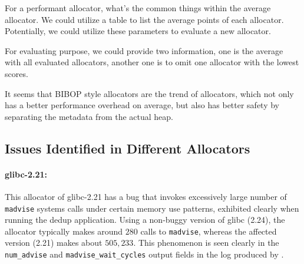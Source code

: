 


For a performant allocator, what's the common things within the average allocator. We could utilize a table to list the average points of each allocator. Potentially, we could utilize these parameters to evaluate a new allocator. 

For evaluating purpose, we could provide two information, one is the average with all evaluated allocators, another one is to omit one allocator with the lowest scores. 


It seems that BIBOP style allocators are the trend of allocators, which not only has a better performance overhead on average, but also has better safety by separating the metadata from the actual heap. 

\subsection{Issues Identified in Different Allocators}

\paragraph{glibc-2.21:}
This allocator of glibc-2.21 has a bug that invokes excessively large number of \texttt{madvise} systems calls under certain memory use patterns, exhibited clearly when running the dedup application. 
Using a non-buggy version of glibc (2.24), the allocator typically makes around $280$ calls to \texttt{madvise}, whereas the affected version (2.21) makes about $505,233$.
	This phenomenon is seen clearly in the \texttt{num\_advise} and \texttt{madvise\_wait\_cycles} output fields in the log produced by \MP{}.

